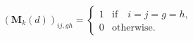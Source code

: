\begin{equation}
	\left(
	\mathbf{M}_{k}
	\left(
	d
	\right)
	\right)_{ij, gh}
	=
	\begin{cases} 
		1 
		  &   
		\text{if} 
		\quad 
		i = j = g = h
		, 
		\\
		0 
		  &   
		\text{otherwise}
		.
	\end{cases}
	\label{eq:linearAlgebra-mcap-diag}
\end{equation}
